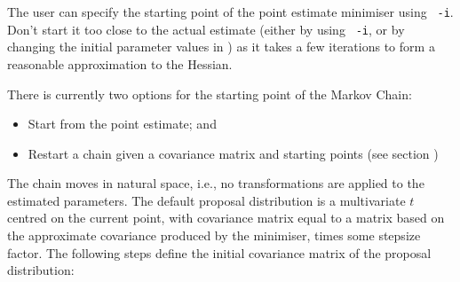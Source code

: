 The user can specify the starting point of the point estimate minimiser using \texttt{\cname\ -i}. Don't start it too close to the actual estimate (either by using \texttt{\cname\ -i}, or by changing the initial parameter values in \config) as it takes a few iterations to form a reasonable approximation to the Hessian. 

There is currently two options for the starting point of the Markov Chain: 

\begin{itemize}
\item Start from the point estimate; and
\item Restart a chain given a covariance matrix and starting points (see section ) 
\end{itemize}

The chain moves in natural space, i.e., no transformations are applied to the estimated parameters. The default proposal distribution is a multivariate $t$ centred on the current point, with covariance matrix equal to a matrix based on the approximate covariance produced by the minimiser, times some stepsize factor. The following steps define the initial covariance matrix of the proposal distribution: 

